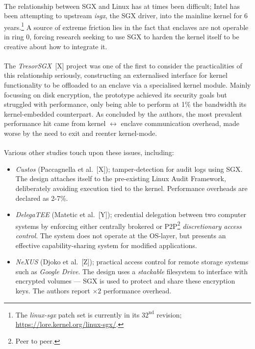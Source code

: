\paragraph{} The relationship between SGX and Linux has at times been difficult; Intel has been attempting to upstream \textit{isgx}, the SGX driver, into the mainline kernel for 6 years.\footnote{The \textit{linux-sgx} patch set is currently in its $32^{\text{nd}}$ revision; \url{https://lore.kernel.org/linux-sgx/}.} A source of extreme friction lies in the fact that enclaves are not operable in ring 0, forcing research seeking to use SGX to harden the kernel itself to be creative about how to integrate it.

\paragraph{} The \textit{TresorSGX}~[X] project was one of the first to consider the practicalities of this relationship seriously, constructing an externalised interface for kernel functionality to be offloaded to an enclave via a specialised kernel module. Mainly focussing on disk encryption, the prototype achieved its security goals but struggled with performance, only being able to perform at 1\% the bandwidth its kernel-embedded counterpart. As concluded by the authors, the most prevalent performance hit came from kernel $\leftrightarrow$ enclave communication overhead, made worse by the need to exit and reenter kernel-mode.


\paragraph{} Various other studies touch upon these issues, including:

\begin{itemize}
    \item \textit{Custos} (Paccagnella et al.~[X]); tamper-detection for audit logs using SGX. The design attaches itself to the pre-existing Linux Audit Framework, deliberately avoiding execution tied to the kernel. Performance overheads are declared as 2-7\%. 
    \item \textit{DelegaTEE} (Matetic et al.~[Y]); credential delegation between two computer systems by enforcing either centrally brokered or P2P\footnote{Peer to peer.} \textit{discretionary access control}. The system does not operate at the OS-layer, but presents an effective capability-sharing system for modified applications.
    \item \textit{NeXUS} (Djoko et al.~[Z]); practical access control for remote storage systems such as \textit{Google Drive}. The design uses a \textit{stackable} filesystem to interface with encrypted volumes --- SGX is used to protect and share these encryption keys. The authors report $\times 2$ performance overhead.
\end{itemize}


